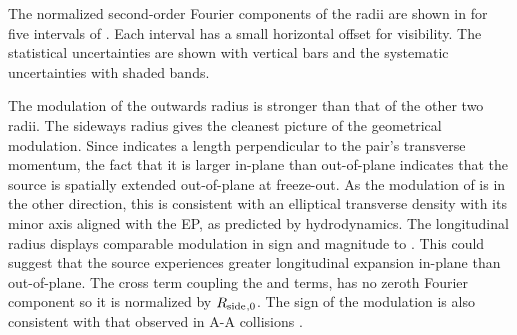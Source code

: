 The normalized second-order Fourier components of the radii are shown in \Fig{\ref{fig:Rosl_vs_q2}} for five intervals of \kt.
Each \kt interval has a small horizontal offset for visibility.
The statistical uncertainties are shown with vertical bars and the systematic uncertainties with shaded bands.

The modulation of the outwards radius \Rout is stronger than that of the other two radii.
The sideways radius \Rside gives the cleanest picture of the geometrical modulation. Since \Rside indicates a length perpendicular to the pair's transverse momentum, the fact that it is larger in-plane than out-of-plane indicates that the source is spatially extended out-of-plane at freeze-out. As the modulation of \Rout is in the other direction, this is consistent with an elliptical transverse density with its minor axis aligned with the EP, as predicted by hydrodynamics.
The longitudinal radius \Rlong displays comparable modulation in sign and magnitude to \Rside. This could suggest that the source experiences greater longitudinal expansion in-plane than out-of-plane.
The cross term coupling the \Rout and \Rside terms, \Ros has no zeroth Fourier component so it is normalized by $R_{\mathrm{side}}{}_{,0}$. The sign of the modulation is also consistent with that observed in A-A collisions \cite{Adams:2003ra,Adare:2014vax,Adamczyk:2014mxp,Adamova:2017opl}.

